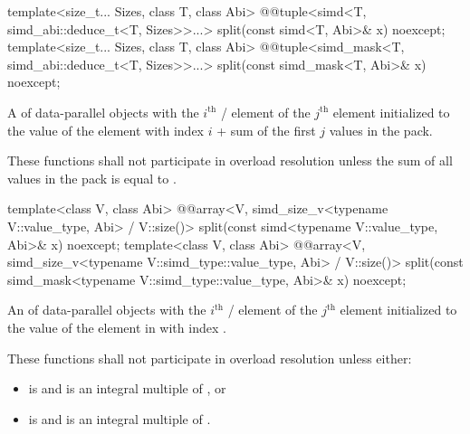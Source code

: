 \begin{itemdecl}
template<size_t... Sizes, class T, class Abi>
  @@tuple<simd<T, simd_abi::deduce_t<T, Sizes>>...>
    split(const simd<T, Abi>& x) noexcept;
template<size_t... Sizes, class T, class Abi>
  @@tuple<simd_mask<T, simd_abi::deduce_t<T, Sizes>>...>
    split(const simd_mask<T, Abi>& x) noexcept;
\end{itemdecl}

\begin{itemdescr}
  \pnum\returns
  A  of data-parallel objects with the $i^\text{th}$ / element of the $j^\text{th}$  element initialized to the value of the element  with index $i$ + sum of the first $j$ values in the  pack.

  \pnum\remarks
  These functions shall not participate in overload resolution unless the sum of all values in the  pack is equal to .
\end{itemdescr}

\begin{itemdecl}
template<class V, class Abi>
  @@array<V, simd_size_v<typename V::value_type, Abi> / V::size()>
    split(const simd<typename V::value_type, Abi>& x) noexcept;
template<class V, class Abi>
  @@array<V, simd_size_v<typename V::simd_type::value_type, Abi> / V::size()>
    split(const simd_mask<typename V::simd_type::value_type, Abi>& x) noexcept;
\end{itemdecl}

\begin{itemdescr}
  \pnum\returns
  An  of data-parallel objects with the $i^\text{th}$ / element of the $j^\text{th}$  element initialized to the value of the element in  with index .

  \pnum\remarks
  These functions shall not participate in overload resolution unless either:
  \begin{itemize}
    \item {} is  and  is an integral multiple of , or
    \item {} is  and  is an integral multiple of .
  \end{itemize}
\end{itemdescr}

